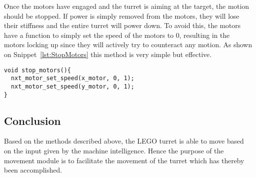 Once the motors have engaged and the turret is aiming at the target, the motion should be stopped.
If power is simply removed from the motors, they will lose their stiffness and the entire turret will power down.
To avoid this, the motors have a function to simply set the speed of the motors to $0$, resulting in the motors locking up since they will actively try to counteract any motion.
As shown on Snippet~\ref{lst:StopMotors} this method is very simple but effective.
\begin{lstlisting}[language=CSharp,label={lst:StopMotors},caption={stop\_motors method from movement.c}]
void stop_motors(){
  nxt_motor_set_speed(x_motor, 0, 1);
  nxt_motor_set_speed(y_motor, 0, 1);
}
\end{lstlisting}

\subsection{Conclusion}
Based on the methods described above, the LEGO turret is able to move based on the input given by the machine intelligence.
Hence the purpose of the movement module is to facilitate the movement of the turret which has thereby been accomplished.
